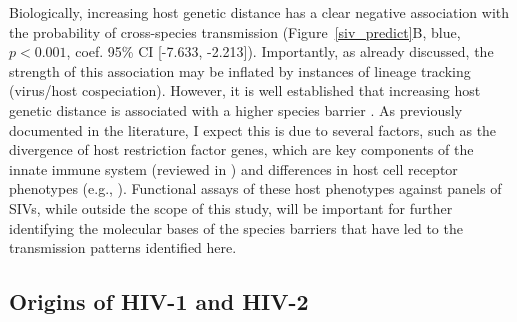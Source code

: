 Biologically, increasing host genetic distance has a clear negative association with the probability of cross-species transmission (Figure~\ref{siv_predict}B, blue, $p<0.001$, coef. 95\% CI [-7.633, -2.213]).
Importantly, as already discussed, the strength of this association may be inflated by instances of lineage tracking (virus/host cospeciation).
However, it is well established that increasing host genetic distance is associated with a higher species barrier \citep{charleston2002preferential}.
As previously documented in the literature, I expect this is due to several factors, such as the divergence of host restriction factor genes, which are key components of the innate immune system (reviewed in \citep{harris2012restriction}) and differences in host cell receptor phenotypes (e.g., \citep{chen1998natural,pandrea2007paucity,riddick2010novel}).
Functional assays of these host phenotypes against panels of SIVs, while outside the scope of this study, will be important for further identifying the molecular bases of the species barriers that have led to the transmission patterns identified here.

\subsection{Origins of HIV-1 and HIV-2}
